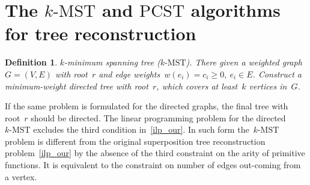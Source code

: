 \documentclass[12pt]{article}
\newtheorem{definition}{Definition}
\begin{document}
\section{The $k\text{-MST}$ and $\text{PCST}$ algorithms for tree reconstruction}


\begin{definition}{$k$-minimum spanning tree ($k\text{-MST}$).}
There given a weighted graph~$G=(V,E)$ with root~$r$ and edge weights~$w(e_i)=c_i\geqslant 0,~e_i\in E$.
Construct a minimum-weight directed tree with root~$r$, which covers at least~$k$ vertices in~$G$.
\end{definition}
If the same problem is formulated for the directed graphs, the final tree with root~$r$ should be directed. The linear programming problem for the directed~$k\text{-MST}$ excludes the third condition in~\eqref{ilp_our}. %
In such form the~$k\text{-MST}$ problem is different from the original superposition tree reconstruction problem~\eqref{ilp_our} by the absence of the third constraint on the arity of primitive functions. It is equivalent to the constraint on number of edges out-coming from a vertex.
\end{document}
